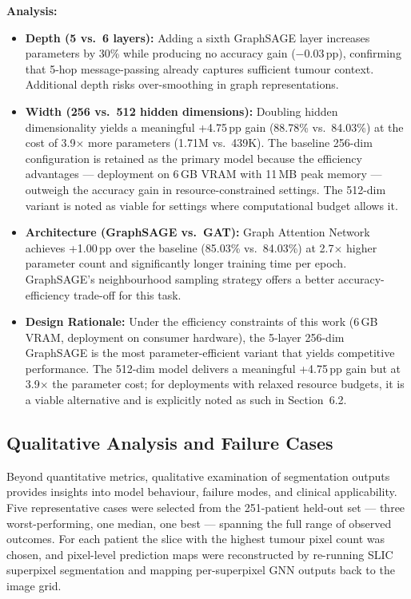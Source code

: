 \documentclass{article}
\begin{document}
\textbf{Analysis:}
\begin{itemize}
    \item \textbf{Depth (5 vs.\ 6 layers):} Adding a sixth GraphSAGE layer increases parameters by 30\% while producing no accuracy gain ($-$0.03\,pp), confirming that 5-hop message-passing already captures sufficient tumour context. Additional depth risks over-smoothing in graph representations.

    \item \textbf{Width (256 vs.\ 512 hidden dimensions):} Doubling hidden dimensionality yields a meaningful +4.75\,pp gain (88.78\% vs.\ 84.03\%) at the cost of 3.9$\times$ more parameters (1.71M vs.\ 439K). The baseline 256-dim configuration is retained as the primary model because the efficiency advantages — deployment on 6\,GB VRAM with 11\,MB peak memory — outweigh the accuracy gain in resource-constrained settings. The 512-dim variant is noted as viable for settings where computational budget allows it.

    \item \textbf{Architecture (GraphSAGE vs.\ GAT):} Graph Attention Network \cite{velickovic2018gat} achieves +1.00\,pp over the baseline (85.03\% vs.\ 84.03\%) at 2.7$\times$ higher parameter count and significantly longer training time per epoch. GraphSAGE's neighbourhood sampling strategy offers a better accuracy-efficiency trade-off for this task.

    \item \textbf{Design Rationale:} Under the efficiency constraints of this work (6\,GB VRAM, deployment on consumer hardware), the 5-layer 256-dim GraphSAGE is the most parameter-efficient variant that yields competitive performance. The 512-dim model delivers a meaningful +4.75\,pp gain but at 3.9$\times$ the parameter cost; for deployments with relaxed resource budgets, it is a viable alternative and is explicitly noted as such in Section~6.2.
\end{itemize}


\subsection{Qualitative Analysis and Failure Cases}

Beyond quantitative metrics, qualitative examination of segmentation outputs provides insights into model behaviour, failure modes, and clinical applicability. Five representative cases were selected from the 251-patient held-out set — three worst-performing, one median, one best — spanning the full range of observed outcomes. For each patient the slice with the highest tumour pixel count was chosen, and pixel-level prediction maps were reconstructed by re-running SLIC superpixel segmentation and mapping per-superpixel GNN outputs back to the image grid.
\end{document}
